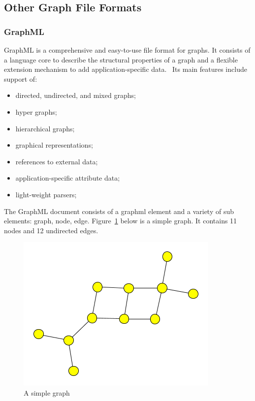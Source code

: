 \subsection{Other Graph File Formats}

\subsubsection{GraphML}
GraphML is a comprehensive and easy-to-use file format for graphs. It consists of a language core to describe the structural properties of a graph and a flexible extension mechanism to add application-specific data.~\cite{GraphML} Its main features include support of:
\begin{itemize}
\item directed, undirected, and mixed graphs;
\item hyper graphs;
\item hierarchical graphs;
\item graphical representations;
\item references to external data;
\item application-specific attribute data;
\item light-weight parsers;
\end{itemize}

The GraphML document consists of a graphml element and a variety of sub elements: graph, node, edge. Figure~\ref{fig:simple_graphml} below is a simple graph. It contains 11 nodes and 12 undirected edges.

\begin{figure}[h!]
\centering
\includegraphics[scale=1.0]{pictures/simple.png}
\caption{A simple graph}
\label{fig:simple_graphml}
\end{figure}



